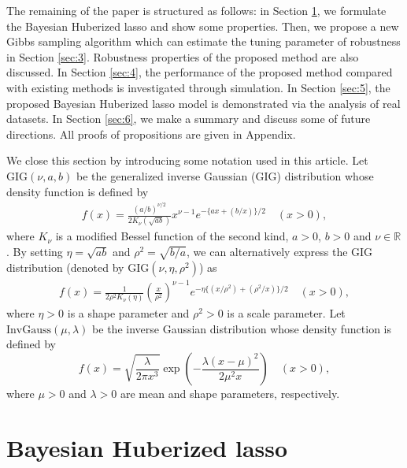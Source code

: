 \documentclass[11pt]{article}
\theoremstyle{plain}
\theoremstyle{definition}
\begin{document}
The remaining of the paper is structured as follows: in Section \ref{sec:2}, we formulate the Bayesian Huberized lasso and show some properties. Then, we propose a new Gibbs sampling algorithm which can estimate the tuning parameter of robustness in Section \ref{sec:3}. Robustness properties of the proposed method are also discussed. In Section \ref{sec:4}, the performance of the proposed method compared with existing methods is investigated through simulation. In Section \ref{sec:5}, the proposed Bayesian Huberized lasso model is demonstrated via the analysis of real datasets. In Section \ref{sec:6}, we make a summary and discuss some of future directions. All proofs of propositions are given in Appendix. 

We close this section by introducing some notation used in this article. Let $\mathrm{GIG}(\nu,a,b)$ be the generalized inverse Gaussian (GIG) distribution whose density function is defined by 
\begin{align}\label{GIG1}
f(x)=\frac{(a/b)^{\nu/2}}{2K_\nu(\sqrt{ab})} x^{\nu-1}e^{-\{ax+(b/x)\}/2}\quad(x>0),
\end{align}
where $K_\nu$ is a modified Bessel function of the second kind, $a>0$, $b>0$ and $\nu \in \mathbb{R}$. By setting $\eta=\sqrt{ab}$ and $\rho^2=\sqrt{b/a}$, we can alternatively express the GIG distribution (denoted by $\mathrm{GIG}(\nu,\eta,\rho^2)$) as 
\begin{align}\label{GIG2}
f(x)=\frac{1}{2\rho^2 K_{\nu}(\eta)}\left(\frac{x}{\rho^2}\right)^{\nu-1}e^{-\eta\{(x/\rho^2)+(\rho^2/x) \}/2} \quad (x>0),
\end{align}
where $\eta>0$ is a shape parameter and $\rho^2>0$ is a scale parameter. Let $\mathrm{InvGauss}(\mu,\lambda)$ be the inverse Gaussian distribution whose density function is defined by 
\[f(x)=\sqrt{\frac{\lambda}{2\pi x^3}} \exp\left(-\frac{\lambda(x-\mu)^2}{2\mu^2 x}\right)\quad (x>0),\] 
where $\mu>0$ and $\lambda>0$ are mean and shape parameters, respectively.


\section{Bayesian Huberized lasso}
\label{sec:2}
\end{document}
